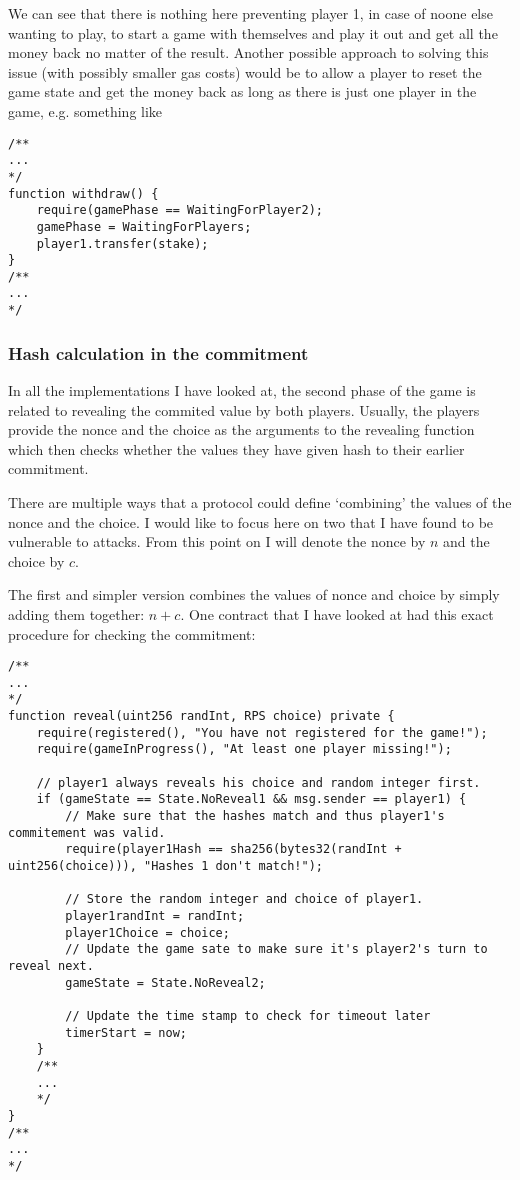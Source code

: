 \documentclass{article}
\begin{document}
    \noindent We can see that there is nothing here
    preventing player 1, in case of noone else wanting to
    play, to start a game with themselves and play it out
    and get all the money back no matter of the result.
    Another possible approach to solving this issue (with
    possibly smaller gas costs) would be to allow a player
    to reset the game state and get the money back as long
    as there is just one player in the game, e.g. something
    like

    \begin{lstlisting}[language=Solidity]
/**
...
*/
function withdraw() {
    require(gamePhase == WaitingForPlayer2);
    gamePhase = WaitingForPlayers;
    player1.transfer(stake);
}
/**
...
*/
    \end{lstlisting}

    \subsubsection{Hash calculation in the commitment}
    In all the implementations I have looked at, the second
    phase of the game is related to revealing the commited
    value by both players. Usually, the players provide the
    nonce and the choice as the arguments to the revealing
    function which then checks whether the values they have
    given hash to their earlier commitment.
    \newline

    \noindent There are multiple ways that a protocol could
    define `combining' the values of the nonce and the
    choice. I would like to focus here on two that I have
    found to be vulnerable to attacks. From this point on I
    will denote the nonce by \(n\) and the choice by \(c\).
    \newline

    \noindent The first and simpler version combines the
    values of nonce and choice by simply adding them
    together: \(n + c\). One contract that I have looked at
    had this exact procedure for checking the commitment:

    \begin{lstlisting}[language=Solidity]
/**
...
*/
function reveal(uint256 randInt, RPS choice) private {
    require(registered(), "You have not registered for the game!");
    require(gameInProgress(), "At least one player missing!");

    // player1 always reveals his choice and random integer first.
    if (gameState == State.NoReveal1 && msg.sender == player1) {
        // Make sure that the hashes match and thus player1's commitement was valid.
        require(player1Hash == sha256(bytes32(randInt + uint256(choice))), "Hashes 1 don't match!");

        // Store the random integer and choice of player1.
        player1randInt = randInt;
        player1Choice = choice;
        // Update the game sate to make sure it's player2's turn to reveal next.
        gameState = State.NoReveal2;

        // Update the time stamp to check for timeout later
        timerStart = now;
    }
    /**
    ...
    */
}
/**
...
*/
    \end{lstlisting}
\end{document}
